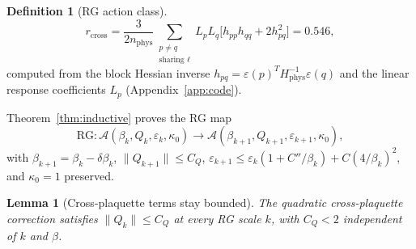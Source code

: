 \documentclass[11pt]{article}
\newtheorem{lemma}[theorem]{Lemma}
\theoremstyle{definition}
\newtheorem{definition}[theorem]{Definition}
\begin{document}
\begin{definition}[RG action class]
\begin{equation}\label{eq:rcross}
r_{\mathrm{cross}}
=\frac{3}{2n_{\mathrm{phys}}}
\sum_{\substack{p\ne q\\\text{sharing }\ell}}
L_p L_q\bigl[h_{pp}h_{qq}+2h_{pq}^2\bigr]
=0.546,
\end{equation}
computed from the block Hessian inverse $h_{pq}=\varepsilon(p)^T
H_{\mathrm{phys}}^{-1}\varepsilon(q)$ and the linear response
coefficients $L_p$ (Appendix~\ref{app:code}).

Theorem~\ref{thm:inductive} proves the RG map
\begin{equation}
\mathrm{RG}\colon
\mathcal{A}(\beta_k,Q_k,\varepsilon_k,\kappa_0)
\to\mathcal{A}(\beta_{k+1},Q_{k+1},\varepsilon_{k+1},\kappa_0),
\end{equation}
with $\beta_{k+1}=\beta_k-\delta\beta_k$,
$\|Q_{k+1}\|\le C_Q$,
$\varepsilon_{k+1}\le\varepsilon_k(1+C''/\beta_k)+C(4/\beta_k)^2$,
and $\kappa_0=1$ preserved.
\end{definition}

\begin{lemma}[Cross-plaquette terms stay bounded]%
\label{lem:Q-bounded}
The quadratic cross-plaquette correction satisfies
$\|Q_k\|\le C_Q$ at every RG scale $k$,
with $C_Q<2$ independent of $k$ and $\beta$.
\end{lemma}
\end{document}
